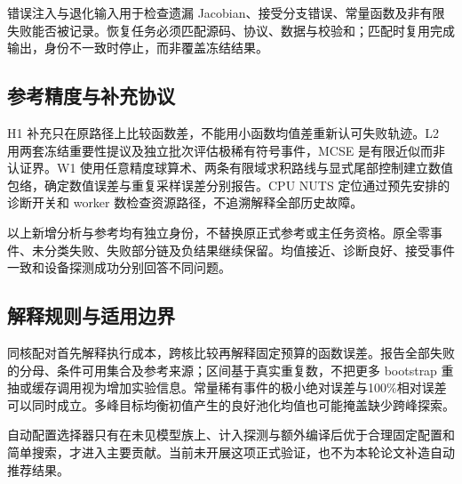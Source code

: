 \documentclass[UTF8,zihao=-4,a4paper,fontset=fandol]{ctexart}
\begin{document}
错误注入与退化输入用于检查遗漏 Jacobian、接受分支错误、常量函数及非有限失败能否被记录。恢复任务必须匹配源码、协议、数据与校验和；匹配时复用完成输出，身份不一致时停止，而非覆盖冻结结果。

\subsection{参考精度与补充协议}
H1 补充只在原路径上比较函数差，不能用小函数均值差重新认可失败轨迹。L2 用两套冻结重要性提议及独立批次评估极稀有符号事件，MCSE 是有限近似而非认证界\cite{owen}。W1 使用任意精度球算术、两条有限域求积路线与显式尾部控制建立数值包络\cite{arb,dlmfquadrature}，确定数值误差与重复采样误差分别报告。CPU NUTS 定位通过预先安排的诊断开关和 worker 数检查资源路径，不追溯解释全部历史故障。

以上新增分析与参考均有独立身份，不替换原正式参考或主任务资格。原全零事件、未分类失败、失败部分链及负结果继续保留。均值接近、诊断良好、接受事件一致和设备探测成功分别回答不同问题。

\subsection{解释规则与适用边界}
同核配对首先解释执行成本，跨核比较再解释固定预算的函数误差。报告全部失败的分母、条件可用集合及参考来源；区间基于真实重复数，不把更多 bootstrap 重抽或缓存调用视为增加实验信息。常量稀有事件的极小绝对误差与100\%相对误差可以同时成立。多峰目标均衡初值产生的良好池化均值也可能掩盖缺少跨峰探索。

自动配置选择器只有在未见模型族上、计入探测与额外编译后优于合理固定配置和简单搜索，才进入主要贡献。当前未开展这项正式验证，也不为本轮论文补造自动推荐结果。
\end{document}
